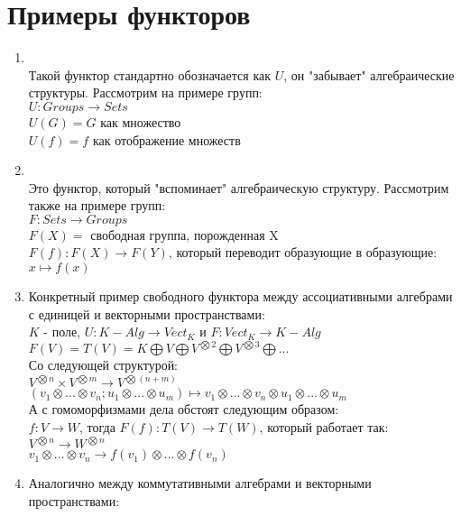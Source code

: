 \documentclass[a4paper]{article}
\theoremstyle{indented}
\theoremstyle{definition}
\theoremstyle{remark}
\DeclareMathOperator{\ra}{\rightarrow}
\begin{document}
\section{Примеры функторов}
\begin{enumerate}
    \item {} \\
    Такой функтор стандартно обозначается как $U$, он "забывает" алгебраические структуры. Рассмотрим на примере групп: \\
    $U: Groups \ra Sets$ \\
    $U(G) = G$ как множество \\
    $U(f) = f$ как отображение множеств
    \item {} \\
    Это функтор, который "вспоминает" алгебраическую структуру. Рассмотрим также на примере групп: \\
    $F: Sets \ra Groups$ \\
    $F(X) = $ свободная группа, порожденная X\\
    $F(f): F(X) \ra F(Y)$, который переводит образующие в образующие: $x \mapsto f(x)$
    \item Конкретный пример свободного функтора между ассоциативными алгебрами с единицей и векторными пространствами: \\
    $K$ - поле, $U: K-Alg \ra Vect_K$ и $F: Vect_K \ra K-Alg$ \\
    $F(V) = T(V) = K \bigoplus V \bigoplus V^{\bigotimes 2} \bigoplus V^{\bigotimes 3} \bigoplus ...$ \\
    Со следующей структурой: \\
    $V^{\bigotimes n} \times V ^{\bigotimes m} \ra V^{\bigotimes (n + m)}$ \\
    $(v_1 \otimes ... \otimes v_n; u_1 \otimes ... \otimes u_m) \mapsto v_1 \otimes ... \otimes v_n \otimes u_1 \otimes ... \otimes u_m$ \\
    А с гомоморфизмами дела обстоят следующим образом: \\
    $f: V \ra W$, тогда $F(f): T(V) \ra T(W)$, который работает так: \\
    $V^{\bigotimes n} \ra W^{\bigotimes n}$ \\
    $v_1 \otimes ... \otimes v_n \ra f(v_1) \otimes ... \otimes f(v_n)$
    \item Аналогично между коммутативными алгебрами и векторными пространствами: \\

\end{enumerate}
\end{document}
